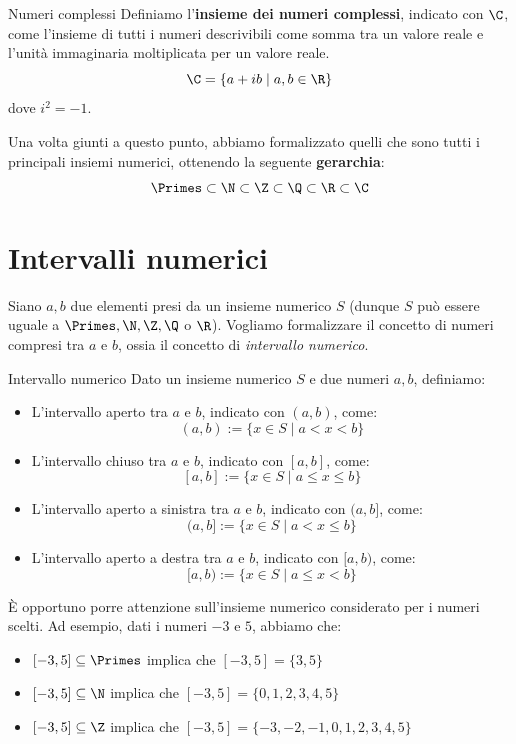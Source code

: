 \documentclass[a4paper, 12pt]{report}
\begin{document}
    \begin{frameddefn}{Numeri complessi}
        Definiamo l'\textbf{insieme dei numeri complessi}, indicato con $\C$, come l'insieme di tutti i numeri descrivibili come somma tra un valore reale e l'unità immaginaria moltiplicata per un valore reale.
        \[\C = \{ a+ib \mid a,b \in \R\}\]
        dove $i^2 = -1$.
    \end{frameddefn}

    Una volta giunti a questo punto, abbiamo formalizzato quelli che sono tutti i principali insiemi numerici, ottenendo la seguente \textbf{gerarchia}:
    \[\Primes \subset \N \subset \Z \subset \Q \subset \R \subset \C\]

    \newpage
    
    \section{Intervalli numerici}

    Siano $a,b$ due elementi presi da un insieme numerico $S$ (dunque $S$ può essere uguale a $\Primes, \N, \Z, \Q$ o $\R$). Vogliamo formalizzare il concetto di numeri compresi tra $a$ e $b$, ossia il concetto di \textit{intervallo numerico}.

    \begin{frameddefn}{Intervallo numerico}
        Dato un insieme numerico $S$ e due numeri $a,b$, definiamo:
        \begin{itemize}
            \item L'intervallo aperto tra $a$ e $b$, indicato con $(a,b)$, come:
            \[(a,b) := \{x \in S \mid a < x < b\}\]
            \item L'intervallo chiuso tra $a$ e $b$, indicato con $[a,b]$, come:
            \[[a,b] := \{x \in S \mid a \leq x \leq b\}\]
            \item L'intervallo aperto a sinistra tra $a$ e $b$, indicato con $(a,b]$, come:
            \[(a,b] := \{x \in S \mid a < x \leq b\}\]
            \item L'intervallo aperto a destra tra $a$ e $b$, indicato con $[a,b)$, come:
            \[[a,b) := \{x \in S \mid a \leq x < b\}\]
        \end{itemize}
    \end{frameddefn}

    È opportuno porre attenzione sull'insieme numerico considerato per i numeri scelti. Ad esempio, dati i numeri $-3$ e $5$, abbiamo che:
    \begin{itemize}
        \item $[-3,5] \subseteq \Primes$ implica che $[-3,5] = \{3,5\}$
        \item $[-3,5] \subseteq \N$ implica che $[-3,5] = \{0,1,2,3,4,5\}$
        \item $[-3,5] \subseteq \Z$ implica che $[-3,5] = \{-3,-2,-1,0,1,2,3,4,5\}$
    \end{itemize}
\end{document}
